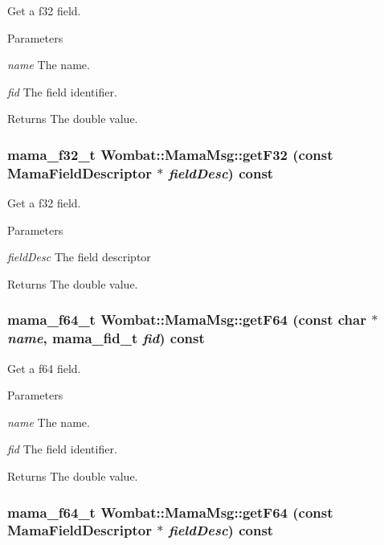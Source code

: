 Get a f32 field. 
\begin{DoxyParams}{Parameters}
\item[{\em name}]The name. \item[{\em fid}]The field identifier. \end{DoxyParams}
\begin{DoxyReturn}{Returns}
The double value. 
\end{DoxyReturn}
\hypertarget{classWombat_1_1MamaMsg_a7d6c83e3d2527999bcd5099076401927}{
\subsubsection[{getF32}]{\setlength{\rightskip}{0pt plus 5cm}mama\_\-f32\_\-t Wombat::MamaMsg::getF32 (const {\bf MamaFieldDescriptor} $\ast$ {\em fieldDesc}) const}}
\label{classWombat_1_1MamaMsg_a7d6c83e3d2527999bcd5099076401927}


Get a f32 field. 
\begin{DoxyParams}{Parameters}
\item[{\em fieldDesc}]The field descriptor \end{DoxyParams}
\begin{DoxyReturn}{Returns}
The double value. 
\end{DoxyReturn}
\hypertarget{classWombat_1_1MamaMsg_a13b0a57a9b0546fe48b63401f5250450}{
\subsubsection[{getF64}]{\setlength{\rightskip}{0pt plus 5cm}mama\_\-f64\_\-t Wombat::MamaMsg::getF64 (const char $\ast$ {\em name}, \/  mama\_\-fid\_\-t {\em fid}) const}}
\label{classWombat_1_1MamaMsg_a13b0a57a9b0546fe48b63401f5250450}


Get a f64 field. 
\begin{DoxyParams}{Parameters}
\item[{\em name}]The name. \item[{\em fid}]The field identifier. \end{DoxyParams}
\begin{DoxyReturn}{Returns}
The double value. 
\end{DoxyReturn}
\hypertarget{classWombat_1_1MamaMsg_afa2fbcd4d9e164ba1d8926f74abc7f13}{
\subsubsection[{getF64}]{\setlength{\rightskip}{0pt plus 5cm}mama\_\-f64\_\-t Wombat::MamaMsg::getF64 (const {\bf MamaFieldDescriptor} $\ast$ {\em fieldDesc}) const}}
\label{classWombat_1_1MamaMsg_afa2fbcd4d9e164ba1d8926f74abc7f13}


